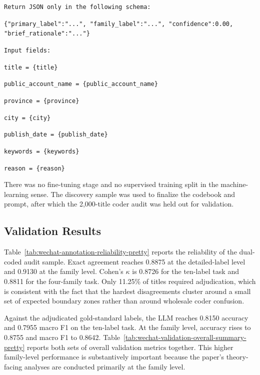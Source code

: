 \documentclass[12pt, american]{article}
\begin{document}
\begin{tcolorbox}[colback=white,title={Prompt used for title-based coding}]
\texttt{Return JSON only in the following schema:}\par
\texttt{\{"primary\_label":"...", "family\_label":"...", "confidence":0.00, "brief\_rationale":"..."\}}\par
\texttt{Input fields:}\par
\texttt{title = \{title\}}\par
\texttt{public\_account\_name = \{public\_account\_name\}}\par
\texttt{province = \{province\}}\par
\texttt{city = \{city\}}\par
\texttt{publish\_date = \{publish\_date\}}\par
\texttt{keywords = \{keywords\}}\par
\texttt{reason = \{reason\}}\par
\end{tcolorbox}

There was no fine-tuning stage and no supervised training split in the machine-learning sense. The discovery sample was used to finalize the codebook and prompt, after which the 2,000-title coder audit was held out for validation.

\subsection{Validation Results \label{app:wechat-validation}}

Table~\ref{tab:wechat-annotation-reliability-pretty} reports the reliability of the dual-coded audit sample. Exact agreement reaches 0.8875 at the detailed-label level and 0.9130 at the family level. Cohen's $\kappa$ is 0.8726 for the ten-label task and 0.8811 for the four-family task. Only 11.25\% of titles required adjudication, which is consistent with the fact that the hardest disagreements cluster around a small set of expected boundary zones rather than around wholesale coder confusion.



Against the adjudicated gold-standard labels, the LLM reaches 0.8150 accuracy and 0.7955 macro F1 on the ten-label task. At the family level, accuracy rises to 0.8755 and macro F1 to 0.8642. Table~\ref{tab:wechat-validation-overall-summary-pretty} reports both sets of overall validation metrics together. This higher family-level performance is substantively important because the paper's theory-facing analyses are conducted primarily at the family level.
\end{document}
